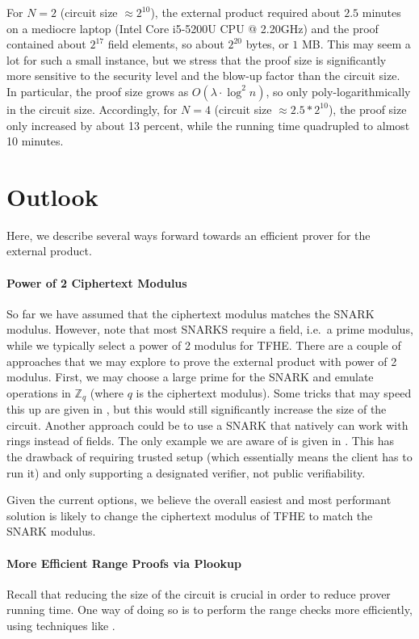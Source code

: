 \documentclass{zamarep}
\begin{document}
For $N=2$ (circuit size $\approx 2^{10}$), the external product required about $2.5$ minutes on a mediocre laptop (Intel Core i5-5200U CPU @ 2.20GHz) and the proof contained about $2^{17}$ field elements, so about $2^{20}$ bytes, or $1$ MB. This may seem a lot for such a small instance, but we stress that the proof size is significantly more sensitive to the security level and the blow-up factor than the circuit size. In particular, the proof size grows as $O(\lambda \cdot \log^2 n)$, so only poly-logarithmically in the circuit size. Accordingly, for $N=4$ (circuit size $\approx 2.5 * 2^{10}$), the proof size only increased by about 13 percent, while the running time quadrupled to almost 10 minutes.

\section{Outlook}
\label{sec:outlook}

Here, we describe several ways forward towards an efficient prover for the external product.

\paragraph{Power of 2 Ciphertext Modulus}
So far we have assumed that the ciphertext modulus matches the SNARK modulus. However, note that most SNARKS require a field, i.e.\ a prime modulus, while we typically select a power of 2 modulus for TFHE. There are a couple of approaches that we may explore to prove the external product with power of 2 modulus. First, we may choose a large prime for the SNARK and emulate operations in $\mathbb{Z}_q$ (where $q$ is the ciphertext modulus). Some tricks that may speed this up are given in \cite{viand2023verifiable}, but this would still significantly increase the size of the circuit. Another approach could be to use a SNARK that natively can work with rings instead of fields. The only example we are aware of is given in \cite{EPRINT:GanNitSor21}. This has the drawback of requiring trusted setup (which essentially means the client has to run it) and only supporting a designated verifier, not public verifiability.

Given the current options, we believe the overall easiest and most performant solution is likely to change the ciphertext modulus of TFHE to match the SNARK modulus.

\paragraph{More Efficient Range Proofs via Plookup}
Recall that reducing the size of the circuit is crucial in order to reduce prover running time. One way of doing so is to perform the range checks more efficiently, using techniques like \cite{EPRINT:PFMBM22,EPRINT:GabWil20}.
\end{document}
